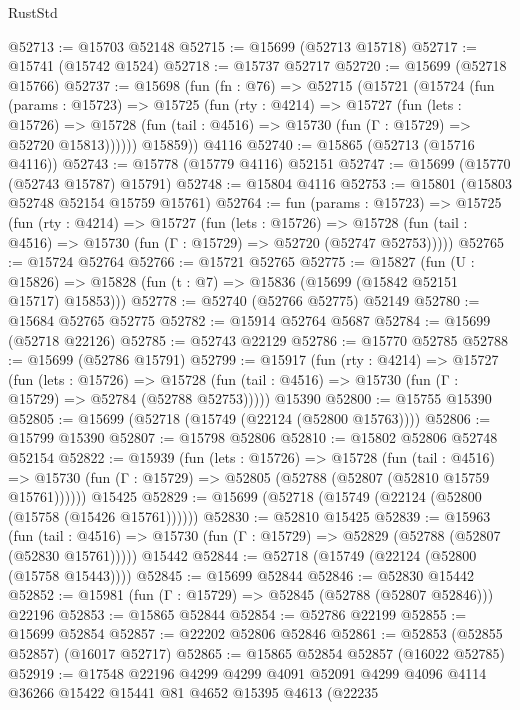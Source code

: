\begin{lexlean}{RustStd}
\begin{coremodule}
@52713 := @15703 @52148
@52715 := @15699 (@52713 @15718)
@52717 := @15741 (@15742 @1524)
@52718 := @15737 @52717
@52720 := @15699 (@52718 @15766)
@52737 := @15698
    (fun (fn : @76) =>
    @52715
      (@15721
        (@15724
          (fun (params : @15723) =>
          @15725
            (fun (rty : @4214) =>
            @15727
              (fun (lets : @15726) =>
              @15728 (fun (tail : @4516) => @15730 (fun (Γ : @15729) => @52720 @15813))))))
        @15859))
    @4116
@52740 := @15865 (@52713 (@15716 @4116))
@52743 := @15778 (@15779 @4116) @52151
@52747 := @15699 (@15770 (@52743 @15787) @15791)
@52748 := @15804 @4116
@52753 := @15801 (@15803 @52748 @52154 @15759 @15761)
@52764 := fun (params : @15723) =>
  @15725
    (fun (rty : @4214) =>
    @15727
      (fun (lets : @15726) =>
      @15728 (fun (tail : @4516) => @15730 (fun (Γ : @15729) => @52720 (@52747 @52753)))))
@52765 := @15724 @52764
@52766 := @15721 @52765
@52775 := @15827
    (fun (U : @15826) => @15828 (fun (t : @7) => @15836 (@15699 (@15842 @52151 @15717) @15853)))
@52778 := @52740 (@52766 @52775) @52149
@52780 := @15684 @52765 @52775
@52782 := @15914 @52764 @5687
@52784 := @15699 (@52718 @22126)
@52785 := @52743 @22129
@52786 := @15770 @52785
@52788 := @15699 (@52786 @15791)
@52799 := @15917
    (fun (rty : @4214) =>
    @15727
      (fun (lets : @15726) =>
      @15728 (fun (tail : @4516) => @15730 (fun (Γ : @15729) => @52784 (@52788 @52753)))))
    @15390
@52800 := @15755 @15390
@52805 := @15699 (@52718 (@15749 (@22124 (@52800 @15763))))
@52806 := @15799 @15390
@52807 := @15798 @52806
@52810 := @15802 @52806 @52748 @52154
@52822 := @15939
    (fun (lets : @15726) =>
    @15728
      (fun (tail : @4516) =>
      @15730 (fun (Γ : @15729) => @52805 (@52788 (@52807 (@52810 @15759 @15761))))))
    @15425
@52829 := @15699 (@52718 (@15749 (@22124 (@52800 (@15758 (@15426 @15761))))))
@52830 := @52810 @15425
@52839 := @15963
    (fun (tail : @4516) => @15730 (fun (Γ : @15729) => @52829 (@52788 (@52807 (@52830 @15761)))))
    @15442
@52844 := @52718 (@15749 (@22124 (@52800 (@15758 @15443))))
@52845 := @15699 @52844
@52846 := @52830 @15442
@52852 := @15981 (fun (Γ : @15729) => @52845 (@52788 (@52807 @52846))) @22196
@52853 := @15865 @52844
@52854 := @52786 @22199
@52855 := @15699 @52854
@52857 := @22202 @52806 @52846
@52861 := @52853 (@52855 @52857) (@16017 @52717)
@52865 := @15865 @52854 @52857 (@16022 @52785)
@52919 := @17548
    @22196
    @4299
    @4299
    @4091
    @52091
    @4299
    @4096
    @4114
    @36266
    @15422
    @15441
    @81
    @4652
    @15395
    @4613
    (@22235

\end{coremodule}
\end{lexlean}
